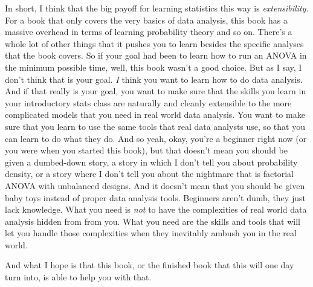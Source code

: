 \documentclass[
]{book}
\begin{document}
In short, I think that the big payoff for learning statistics this way is \emph{extensibility}. For a book that only covers the very basics of data analysis, this book has a massive overhead in terms of learning probability theory and so on. There's a whole lot of other things that it pushes you to learn besides the specific analyses that the book covers. So if your goal had been to learn how to run an ANOVA in the minimum possible time, well, this book wasn't a good choice. But as I say, I don't think that is your goal. \emph{I} think you want to learn how to do data analysis. And if that really is your goal, you want to make sure that the skills you learn in your introductory stats class are naturally and cleanly extensible to the more complicated models that you need in real world data analysis. You want to make sure that you learn to use the same tools that real data analysts use, so that you can learn to do what they do. And so yeah, okay, you're a beginner right now (or you were when you started this book), but that doesn't mean you should be given a dumbed-down story, a story in which I don't tell you about probability density, or a story where I don't tell you about the nightmare that is factorial ANOVA with unbalanced designs. And it doesn't mean that you should be given baby toys instead of proper data analysis tools. Beginners aren't dumb, they just lack knowledge. What you need is \emph{not} to have the complexities of real world data analysis hidden from from you. What you need are the skills and tools that will let you handle those complexities when they inevitably ambush you in the real world.

And what I hope is that this book, or the finished book that this will one day turn into, is able to help you with that.
\end{document}
